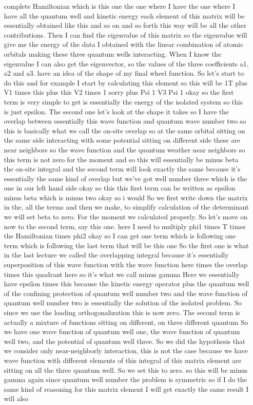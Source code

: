 complete Hamiltonian which is this one the one where I have the one where I have all the quantum well and kinetic energy each element of this matrix will be essentially obtained like this and so on and so forth this way will be all the other contributions. Then I can find the eigenvalue of this matrix so the eigenvalue will give me the energy of the data I obtained with the linear combination of atomic orbitals making these three quantum wells interacting. When I know the eigenvalue I can also get the eigenvector, so the values of the three coefficients a1, a2 and a3. have an idea of the shape of my final wheel function. So let's start to do this and for example I start by calculating this element so this will be 1T plus V1 times this plus this V2 times 1 sorry plus Psi 1 V3 Psi 1 okay so the first term is very simple to get is essentially the energy of the isolated system so this is just epsilon. The second one let's look at the shape it takes so I have the overlap between essentially this wave function and quantum wave number two so this is basically what we call the on-site overlap so at the same orbital sitting on the same side interacting with some potential sitting on different side these are near neighbors so the wave function and the quantum weather near neighbors so this term is not zero for the moment and so this will essentially be minus beta the on-site integral and the second term will look exactly the same because it's essentially the same kind of overlap but we've got well number three which is the one in our left hand side okay so this this first term can be written as epsilon minus beta which is minus two okay so i would So we first write down the matrix in the, all the terms and then we make, to simplify calculation of the determinant we will set beta to zero. For the moment we calculated properly. So let's move on now to the second term, say this one. here I need to multiply phi1 times T times the Hamiltonian times phi2 okay so I can get one term which is following one term which is following the last term that will be this one So the first one is what in the last lecture we called the overlapping integral because it's essentially superposition of this wave function with the wave function here times the overlap times this quadrant here so it's what we call minus gamma Here we essentially have epsilon times this because the kinetic energy operator plus the quantum well of the confining protection of quantum well number two and the wave function of quantum well number two is essentially the solution of the isolated problem. So since we use the loading orthogonalization this is now zero. The second term is actually a mixture of functions sitting on different, on three different quantum So we have one wave function of quantum well one, the wave function of quantum well two, and the potential of quantum well three. So we did the hypothesis that we consider only near-neighborly interaction, this is not the case because we have wave function with different elements of this integral of this matrix element are sitting on all the three quantum well. So we set this to zero. so this will be minus gamma again since quantum well number the problem is symmetric so if I do the same kind of reasoning for this matrix element I will get exactly the same result I will also 